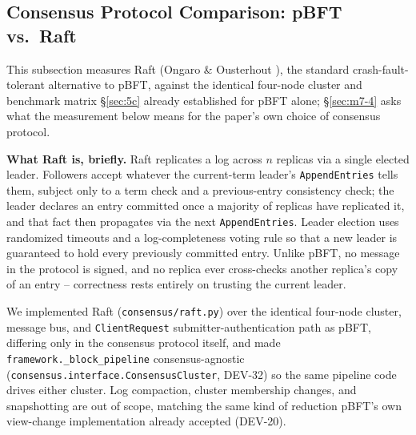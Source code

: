 \documentclass[conference]{IEEEtran}
\begin{document}
\subsection{Consensus Protocol Comparison: pBFT vs.\ Raft}
\label{sec:5c-raft}

This subsection measures Raft (Ongaro \& Ousterhout \cite{ongaro2014raft}), the standard
crash-fault-tolerant alternative to pBFT, against the identical four-node cluster and benchmark
matrix \S\ref{sec:5c} already established for pBFT alone; \S\ref{sec:m7-4} asks what the
measurement below means for the paper's own choice of consensus protocol.

\textbf{What Raft is, briefly.} Raft replicates a log across $n$ replicas via a single elected
leader. Followers accept whatever the current-term leader's \texttt{AppendEntries} tells them,
subject only to a term check and a previous-entry consistency check; the leader declares an entry
committed once a majority of replicas have replicated it, and that fact then propagates via the
next \texttt{AppendEntries}. Leader election uses randomized timeouts and a log-completeness
voting rule so that a new leader is guaranteed to hold every previously committed entry. Unlike
pBFT, no message in the protocol is signed, and no replica ever cross-checks another replica's
copy of an entry -- correctness rests entirely on trusting the current leader.

We implemented Raft (\texttt{consensus/raft.py}) over the identical four-node cluster, message
bus, and \texttt{ClientRequest} submitter-authentication path as pBFT, differing only in the
consensus protocol itself, and made \texttt{framework.\_block\_pipeline} consensus-agnostic
(\texttt{consensus.interface.ConsensusCluster}, DEV-32) so the same pipeline code drives either
cluster. Log compaction, cluster membership changes, and snapshotting are out of scope, matching
the same kind of reduction pBFT's own view-change implementation already accepted (DEV-20).
\end{document}
